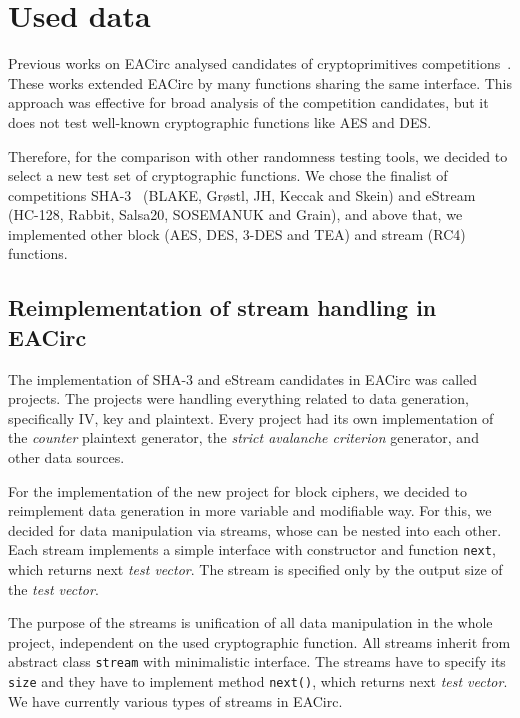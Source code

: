 \documentclass[
    digital,    %
    oneside,    %
    color,
    11pt,
    nocover,
    notable,
    nolof,
    nolot,
]{fithesis3}
\begin{document}
\section{Used data}
\label{sec:method-data}

Previous works on EACirc analysed candidates of cryptoprimitives competitions~\cite{estreamMgrThesis,sha3Thesis,ukropMgrThesis}. These works extended EACirc by many functions sharing the same interface. This approach was effective for broad analysis of the competition candidates, but it does not test well-known cryptographic functions like AES and DES.

Therefore, for the comparison with other randomness testing tools, we decided to select a new test set of cryptographic functions. We chose the finalist of competitions SHA-3~\cite{sha3-competition} (BLAKE, Gr\o stl, JH, Keccak and Skein) and eStream~\cite{estream-competition} (HC-128, Rabbit, Salsa20, SOSEMANUK and Grain), and above that, we implemented other block (AES, DES, 3-DES and TEA) and stream (RC4) functions.

\subsection{Reimplementation of stream handling in EACirc}
\label{subsec:method-data-streams}

The implementation of SHA-3 and eStream candidates in EACirc was called projects. The projects were handling everything related to data generation, specifically IV, key and plaintext. Every project had its own implementation of the \textit{counter} plaintext generator, the \textit{strict avalanche criterion} generator, and other data sources.

For the implementation of the new project for block ciphers, we decided to reimplement data generation in more variable and modifiable way. For this, we decided for data manipulation via streams, whose can be nested into each other. Each stream implements a simple interface with constructor and function \texttt{next}, which returns next \textit{test vector}. The stream is specified only by the output size of the \textit{test vector}.

The purpose of the streams is unification of all data manipulation in the whole project, independent on the used cryptographic function. All streams inherit from abstract class \texttt{stream} with minimalistic interface. The streams have to specify its \texttt{size} and they have to implement method \texttt{next()}, which returns next \textit{test vector}. We have currently various types of streams in EACirc.
\end{document}
